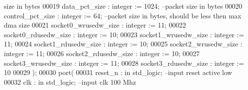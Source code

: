 \begin{DoxyCode}
{       size in bytes}
00019                 \textcolor{vhdlchar}{data_pct_size}           \textcolor{vhdlchar}{:} \textcolor{comment}{integer} \textcolor{vhdlchar}{:=} \textcolor{vhdllogic}{}\textcolor{vhdllogic}{1024};\textcolor{keyword}{                          --packet size in bytes}
00020                 \textcolor{vhdlchar}{control_pct_size}        \textcolor{vhdlchar}{:} \textcolor{comment}{integer} \textcolor{vhdlchar}{:=} \textcolor{vhdllogic}{}\textcolor{vhdllogic}{64};\textcolor{keyword}{                                --packet size in
       bytes, should be less then max dma size}
00021                 \textcolor{vhdlchar}{socket0_wrusedw_size} \textcolor{vhdlchar}{:} \textcolor{comment}{integer} \textcolor{vhdlchar}{:=} \textcolor{vhdllogic}{}\textcolor{vhdllogic}{11};
00022                 \textcolor{vhdlchar}{socket0_rdusedw_size}    \textcolor{vhdlchar}{:} \textcolor{comment}{integer} \textcolor{vhdlchar}{:=} \textcolor{vhdllogic}{}\textcolor{vhdllogic}{10};
00023                 \textcolor{vhdlchar}{socket1_wrusedw_size} \textcolor{vhdlchar}{:} \textcolor{comment}{integer} \textcolor{vhdlchar}{:=} \textcolor{vhdllogic}{}\textcolor{vhdllogic}{11};
00024                 \textcolor{vhdlchar}{socket1_rdusedw_size}    \textcolor{vhdlchar}{:} \textcolor{comment}{integer} \textcolor{vhdlchar}{:=} \textcolor{vhdllogic}{}\textcolor{vhdllogic}{10};
00025                 \textcolor{vhdlchar}{socket2_wrusedw_size} \textcolor{vhdlchar}{:} \textcolor{comment}{integer} \textcolor{vhdlchar}{:=} \textcolor{vhdllogic}{}\textcolor{vhdllogic}{11};
00026                 \textcolor{vhdlchar}{socket2_rdusedw_size}    \textcolor{vhdlchar}{:} \textcolor{comment}{integer} \textcolor{vhdlchar}{:=} \textcolor{vhdllogic}{}\textcolor{vhdllogic}{10};
00027                 \textcolor{vhdlchar}{socket3_wrusedw_size} \textcolor{vhdlchar}{:} \textcolor{comment}{integer} \textcolor{vhdlchar}{:=} \textcolor{vhdllogic}{}\textcolor{vhdllogic}{11};
00028                 \textcolor{vhdlchar}{socket3_rdusedw_size}    \textcolor{vhdlchar}{:} \textcolor{comment}{integer} \textcolor{vhdlchar}{:=} \textcolor{vhdllogic}{}\textcolor{vhdllogic}{10}
00029                 \textcolor{vhdlchar}{)};
00030     \textcolor{keywordflow}{port}\textcolor{vhdlchar}{(}
00031         \textcolor{vhdlchar}{reset_n}                     \textcolor{vhdlchar}{:} \textcolor{keywordflow}{in} \textcolor{comment}{std\_logic};\textcolor{keyword}{                                 --input reset active
       low}
00032         \textcolor{vhdlchar}{clk}                 \textcolor{vhdlchar}{:} \textcolor{keywordflow}{in} \textcolor{comment}{std\_logic};\textcolor{keyword}{                                 --input clk 100 Mhz  }

\end{DoxyCode}
